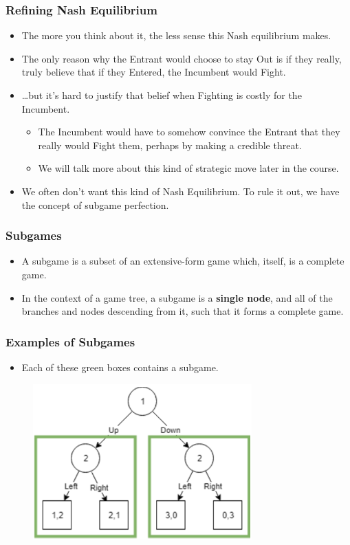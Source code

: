 \begin{frame}
\frametitle{Refining Nash Equilibrium}
\begin{itemize}
\item The more you think about it, the less sense this Nash equilibrium makes.
\item The only reason why the Entrant would choose to stay Out is if they really, truly believe that if they Entered, the Incumbent would Fight.
\item \dots but it's hard to justify that belief when Fighting is costly for the Incumbent.
\begin{itemize}
\item The Incumbent would have to somehow convince the Entrant that they really would Fight them, perhaps by making a \alert{credible threat}.
\item We will talk more about this kind of \alert{strategic move} later in the course.
\end{itemize}
\item We often don't want this kind of Nash Equilibrium. To rule it out, we have the concept of \alert{subgame perfection}.
\end{itemize}
\end{frame}

\begin{frame}
\frametitle{Subgames}
\begin{itemize}
\item A \alert{subgame} is a subset of an extensive-form game which, itself, is a complete game.
\item In the context of a game tree, a subgame is a \textbf{single node}, and all of the branches and nodes descending from it, such that it forms a complete game.
\end{itemize}
\end{frame}

\begin{frame}
\frametitle{Examples of Subgames}
\begin{itemize}
\item Each of these green boxes contains a subgame.
\end{itemize}
\begin{figure}
\centering
\includegraphics[width=0.75\textwidth]{figures/06SubgameExample01.png}
\end{figure}
\end{frame}

